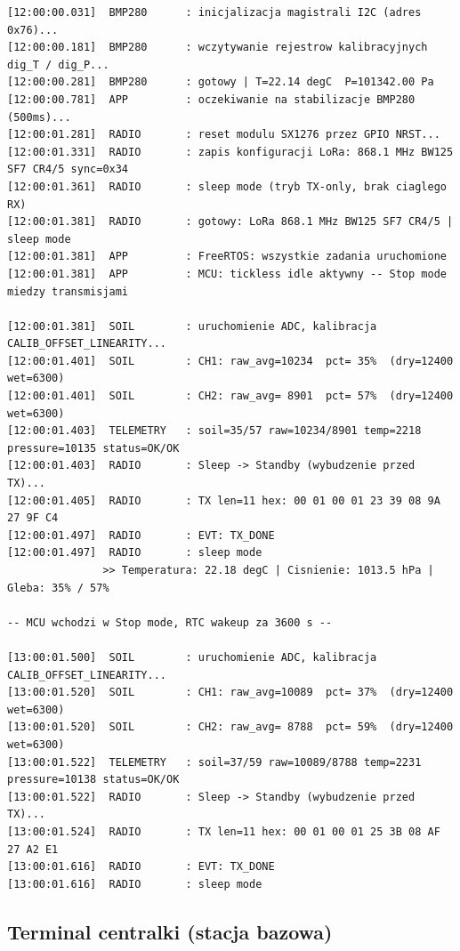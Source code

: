 \documentclass[12pt,a4paper]{article}
\begin{document}
\begin{lstlisting}[basicstyle=\ttfamily\scriptsize, frame=single,
                   caption={Wyjście UART węzła czujnikowego (UART przez ST-LINK)}]
[12:00:00.031]  BMP280      : inicjalizacja magistrali I2C (adres 0x76)...
[12:00:00.181]  BMP280      : wczytywanie rejestrow kalibracyjnych dig_T / dig_P...
[12:00:00.281]  BMP280      : gotowy | T=22.14 degC  P=101342.00 Pa
[12:00:00.781]  APP         : oczekiwanie na stabilizacje BMP280 (500ms)...
[12:00:01.281]  RADIO       : reset modulu SX1276 przez GPIO NRST...
[12:00:01.331]  RADIO       : zapis konfiguracji LoRa: 868.1 MHz BW125 SF7 CR4/5 sync=0x34
[12:00:01.361]  RADIO       : sleep mode (tryb TX-only, brak ciaglego RX)
[12:00:01.381]  RADIO       : gotowy: LoRa 868.1 MHz BW125 SF7 CR4/5 | sleep mode
[12:00:01.381]  APP         : FreeRTOS: wszystkie zadania uruchomione
[12:00:01.381]  APP         : MCU: tickless idle aktywny -- Stop mode miedzy transmisjami

[12:00:01.381]  SOIL        : uruchomienie ADC, kalibracja CALIB_OFFSET_LINEARITY...
[12:00:01.401]  SOIL        : CH1: raw_avg=10234  pct= 35%  (dry=12400 wet=6300)
[12:00:01.401]  SOIL        : CH2: raw_avg= 8901  pct= 57%  (dry=12400 wet=6300)
[12:00:01.403]  TELEMETRY   : soil=35/57 raw=10234/8901 temp=2218 pressure=10135 status=OK/OK
[12:00:01.403]  RADIO       : Sleep -> Standby (wybudzenie przed TX)...
[12:00:01.405]  RADIO       : TX len=11 hex: 00 01 00 01 23 39 08 9A 27 9F C4
[12:00:01.497]  RADIO       : EVT: TX_DONE
[12:00:01.497]  RADIO       : sleep mode
               >> Temperatura: 22.18 degC | Cisnienie: 1013.5 hPa | Gleba: 35% / 57%

-- MCU wchodzi w Stop mode, RTC wakeup za 3600 s --

[13:00:01.500]  SOIL        : uruchomienie ADC, kalibracja CALIB_OFFSET_LINEARITY...
[13:00:01.520]  SOIL        : CH1: raw_avg=10089  pct= 37%  (dry=12400 wet=6300)
[13:00:01.520]  SOIL        : CH2: raw_avg= 8788  pct= 59%  (dry=12400 wet=6300)
[13:00:01.522]  TELEMETRY   : soil=37/59 raw=10089/8788 temp=2231 pressure=10138 status=OK/OK
[13:00:01.522]  RADIO       : Sleep -> Standby (wybudzenie przed TX)...
[13:00:01.524]  RADIO       : TX len=11 hex: 00 01 00 01 25 3B 08 AF 27 A2 E1
[13:00:01.616]  RADIO       : EVT: TX_DONE
[13:00:01.616]  RADIO       : sleep mode
\end{lstlisting}

\subsection{Terminal centralki (stacja bazowa)}
\end{document}
